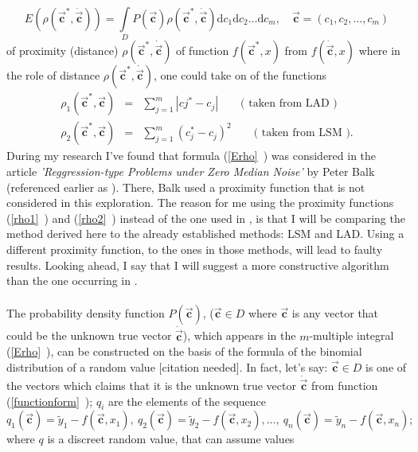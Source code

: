 \documentclass[11pt,a4paper]{article}
\numberwithin{equation}{subsection}
\newcommand{\vecc}{\vec{\textbf{c}}}
\begin{document}
\begin{equation}
E(\rho(\vecc^{*},\dot{\vecc}))= \int\limits_{D}P(\vecc)\rho(\vecc^{*},\dot{\vecc})\mathrm{d}c_{1}\mathrm{d}c_{2}\dots \mathrm{d}c_{m}, \quad \vecc = (c_{1},c_{2},\dots,c_{m}) \label{Erho}
\end{equation}
of proximity (distance) $\rho(\vecc^{*},\dot{\vecc})$ of function $f(\vecc^{*},x)$ from $f(\dot{\vecc},x)$ where in the role of distance $\rho(\vecc^{*},\dot{\vecc})$, one could take on of the functions
\begin{eqnarray}
\rho_{1}(\vecc^{*},\vecc) &=& \sum\limits_{j=1}^{m} \left| c{j}^{*}-c_{j} \right| \label{rho1} \qquad \text{( taken from LAD )}\\
\rho_{2}(\vecc^{*},\vecc) &=& \sum\limits_{j=1}^{m} \left( c_{j}^{*}-c_{j} \right)^{2} \label{rho2} \qquad \text{( taken from LSM ).}
\end{eqnarray}
During my research I've found that formula (\vref{Erho}~) was considered in the article \textit{'Reggression-type Problems under Zero Median Noise'} by Peter Balk (referenced earlier as \citep{balk_2010}). There, Balk used a proximity function that is not considered in this exploration. The reason for me using the proximity functions (\vref{rho1}~) and (\vref{rho2}~) instead of the one used in \citep{balk_2010}, is that I will be comparing the method derived here to the already established methods: LSM and LAD. Using a different proximity function, to the ones in those methods, will lead to faulty results. Looking ahead, I say that I will suggest a more constructive algorithm than the one occurring in \citep{balk_2010}.\\
\\
The probability density function $P(\vecc)$, ($\vecc \in D$ where $\vecc$ is any vector that could be the unknown true vector $\dot{\vecc}$), which appears in the $m$-multiple integral (\vref{Erho}~), can be constructed on the basis of the formula of the binomial distribution of a random value [citation needed]. In fact, let's say: $\vecc \in D$ is one of the vectors which claims that it is the unknown true vector $ \dot{\vecc}$ from function (\vref{functionform}~); $q_{i}$ are the elements of the sequence
\begin{equation}
q_{1}(\vecc)=\tilde{y}_{1}-f(\vecc,x_{1}),\ q_{2}(\vecc)=\tilde{y}_{2}-f(\vecc,x_{2}), \dots, \ q_{n}(\vecc)=\tilde{y}_{n}-f(\vecc,x_{n}); \label{sequence}
\end{equation}
where $q$ is a discreet random value, that can assume values
\end{document}
